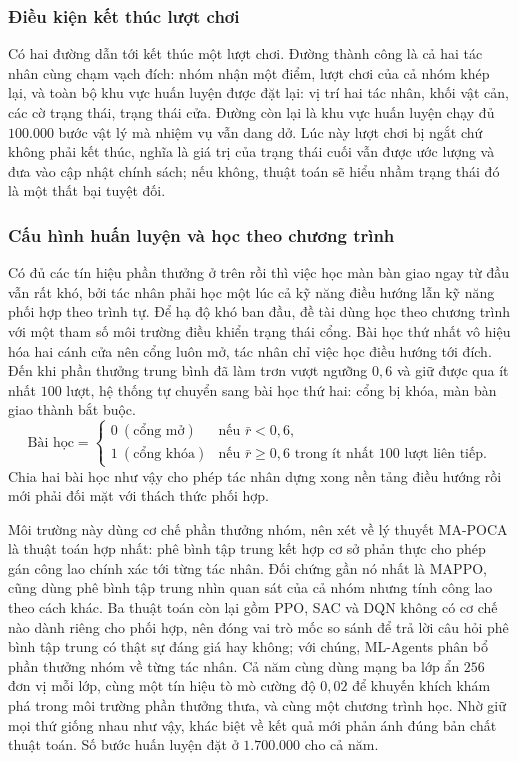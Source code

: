 \subsubsection{Điều kiện kết thúc lượt chơi}
\indent Có hai đường dẫn tới kết thúc một lượt chơi. Đường thành công là cả hai tác nhân
cùng chạm vạch đích: nhóm nhận một điểm, lượt chơi của cả nhóm khép lại, và toàn bộ khu vực
huấn luyện được đặt lại: vị trí hai tác nhân, khối vật cản, các cờ trạng thái, trạng
thái cửa. Đường còn lại là khu vực huấn luyện chạy đủ $100.000$ bước vật lý mà nhiệm vụ vẫn
dang dở. Lúc này lượt chơi bị ngắt chứ không phải kết thúc, nghĩa là giá trị của
trạng thái cuối vẫn được ước lượng và đưa vào cập nhật chính sách; nếu không, thuật toán
sẽ hiểu nhầm trạng thái đó là một thất bại tuyệt đối.

\subsubsection{Cấu hình huấn luyện và học theo chương trình}
\label{sub:coop-curriculum}
\indent Có đủ các tín hiệu phần thưởng ở trên rồi thì việc học màn bàn giao ngay từ đầu
vẫn rất khó, bởi tác nhân phải học một lúc cả kỹ năng điều hướng lẫn kỹ năng phối hợp theo
trình tự. Để hạ độ khó ban đầu, đề tài dùng học theo chương trình với một tham số môi
trường điều khiển trạng thái cổng. Bài học thứ nhất vô hiệu hóa hai cánh cửa nên cổng luôn
mở, tác nhân chỉ việc học điều hướng tới đích. Đến khi phần thưởng trung bình đã làm trơn
vượt ngưỡng $0{,}6$ và giữ được qua ít nhất $100$ lượt, hệ thống tự chuyển sang bài học
thứ hai: cổng bị khóa, màn bàn giao thành bắt buộc.
\begin{equation}
\text{Bài học} =
\begin{cases}
0 \ (\text{cổng mở}) & \text{nếu } \bar{r} < 0{,}6, \\[2pt]
1 \ (\text{cổng khóa}) & \text{nếu } \bar{r} \ge 0{,}6 \text{ trong ít nhất } 100
\text{ lượt liên tiếp}.
\end{cases}
\end{equation}
Chia hai bài học như vậy cho phép tác nhân dựng xong nền tảng điều hướng rồi mới phải đối
mặt với thách thức phối hợp.

\indent Môi trường này dùng cơ chế phần thưởng nhóm, nên xét về lý thuyết MA-POCA là thuật
toán hợp nhất: phê bình tập trung kết hợp cơ sở phản thực cho phép gán công lao chính xác
tới từng tác nhân. Đối chứng gần nó nhất là MAPPO, cũng dùng phê bình tập trung nhìn quan
sát của cả nhóm nhưng tính công lao theo cách khác. Ba thuật toán còn lại gồm PPO, SAC và DQN
không có cơ chế nào dành riêng cho phối hợp, nên đóng vai trò mốc so sánh để trả lời câu
hỏi phê bình tập trung có thật sự đáng giá hay không; với chúng, ML-Agents phân bổ phần
thưởng nhóm về từng tác nhân. Cả năm cùng dùng mạng ba lớp ẩn $256$ đơn vị mỗi lớp, cùng một
tín hiệu tò mò cường độ $0{,}02$ để khuyến khích khám phá trong môi
trường phần thưởng thưa, và cùng một chương trình học. Nhờ giữ mọi thứ giống nhau như vậy,
khác biệt về kết quả mới phản ánh đúng bản chất thuật toán. Số bước huấn luyện đặt ở $1.700.000$ cho cả năm.

